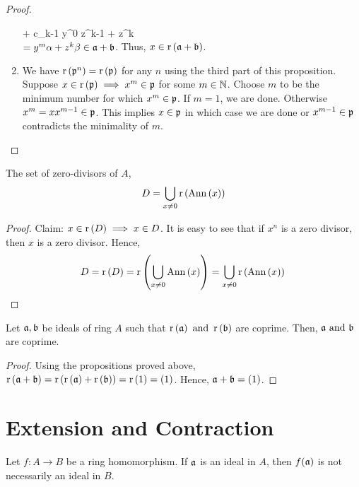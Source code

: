 \begin{proof}
\begin{enumerate}
{			+ c_{k-1} y^0 z^{k-1}} + z^k  \) \\
			\( = y^m \alpha + z^k \beta \in \mathfrak{a} + \mathfrak{b} \).
			Thus, \( x \in \operatorname{r} \left( \mathfrak{a} + \mathfrak{b} \right) \).
		\item
			We have \( \operatorname{r} \left( \mathfrak{p}^n \right) = \operatorname{r} \left( \mathfrak{p} \right) \) for any \(n\)
			using the third part of this proposition. \\
			Suppose \( x \in \operatorname{r} \left( \mathfrak{p} \right) \implies
			x^m \in \mathfrak{p} \) for some \( m \in \NN \).
			Choose \( m \) to be the minimum number for which
			\( x^m \in \mathfrak{p} \).
			If \( m = 1 \), we are done.
			Otherwise \( x^m = x x^{m-1} \in \mathfrak{p} \).
			This implies \( x \in \mathfrak{p} \) in which case we are done or
			\( x^{m-1} \in \mathfrak{p} \) contradicts the minimality of \( m \).
	\end{enumerate}
\end{proof}


\begin{proposition}{}{}
	The set of zero-divisors of \( A \),
	\[
		D = \bigcup_{x \neq 0} \operatorname{r} \left( \operatorname{Ann}\left( x \right) \right)
	\]
\end{proposition}

\begin{proof}
	Claim: \( x \in \operatorname{r}\left( D \right) \implies x \in D \).
	It is easy to see that if \( x^n \) is a zero divisor,
	then \( x \) is a zero divisor.
	Hence,
	\[
		D = \operatorname{r}\left( D \right) = \operatorname{r} \left( \bigcup_{x \neq 0} \operatorname{Ann}\left( x \right) \right) =
		\bigcup_{x \neq 0} \operatorname{r} \left( \operatorname{Ann}\left( x \right) \right) \qedhere
	\]
\end{proof}

\begin{proposition}{}{}
	Let \( \mathfrak{a}, \mathfrak{b} \) be ideals of ring \( A \) such that
	\( \operatorname{r}\left( \mathfrak{a} \right) \text{ and } \operatorname{r}\left( \mathfrak{b} \right) \) are coprime.
	Then, \( \mathfrak{a} \text{ and } \mathfrak{b} \) are coprime.
\end{proposition}

\begin{proof}
	Using the propositions proved above,
	\( \operatorname{r}\left( \mathfrak{a} + \mathfrak{b} \right) = \operatorname{r}\left( \operatorname{r}\left( \mathfrak{a} \right) + \operatorname{r}\left( \mathfrak{b} \right) \right)
	= \operatorname{r}\left( 1 \right) = \left( 1 \right) \).
	Hence, \( \mathfrak{a} + \mathfrak{b} = \left( 1 \right) \).
\end{proof}



\section{Extension and Contraction}

Let \(f \colon A \to B\) be a ring homomorphism.
If \(\mathfrak{a}\) is an ideal in \(A\), then \(f(\mathfrak{a})\) is not necessarily
an ideal in \(B\).

